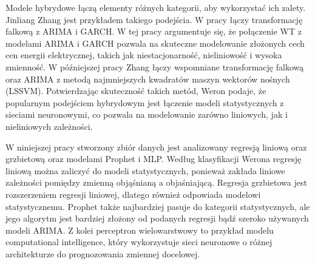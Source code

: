 Modele hybrydowe łączą elementy różnych kategorii, aby wykorzystać ich zalety. Jinliang Zhang jest przykładem takiego podejścia. W pracy \cite{TAN20103606} łączy transformację falkową z ARIMA i GARCH. W tej pracy argumentuje się, że połączenie WT z modelami ARIMA i GARCH pozwala na skuteczne modelowanie złożonych cech cen energii elektrycznej, takich jak niestacjonarność, nieliniowość i wysoka zmienność. W późniejszej pracy Zhang \cite{ZHANG2012695} łączy wspomniane transformację falkową oraz ARIMA z metodą najmniejszych kwadratów maszyn wektorów nośnych (LSSVM). Potwierdzając skuteczność takich metód, Weron \cite{WERON20141030} podaje, że popularnym podejściem hybrydowym jest łączenie modeli statystycznych z sieciami neuronowymi, co pozwala na modelowanie zarówno liniowych, jak i nieliniowych zależności.

W niniejszej pracy stworzony zbiór danych jest analizowany regresją liniową oraz grzbietową oraz modelami Prophet i MLP. Według klasyfikacji Werona regresję liniową można zaliczyć do modeli statystycznych, ponieważ zakłada liniowe zależności pomiędzy zmienną objąśnianą a objaśniającą. Regresja grzbietowa jest rozszerzeniem regresji liniowej, dlatego również odpowiada modelowi statystycznemu. Prophet także najbardziej pasuje do kategorii statystycznych, ale jego algorytm jest bardziej złożony od podanych regresji bądź szeroko używanych modeli ARIMA. Z kolei perceptron wielowarstwowy to przykład modelu computational intelligence, który wykorzystuje sieci neuronowe o różnej architekturze do prognozowania zmiennej docelowej.
